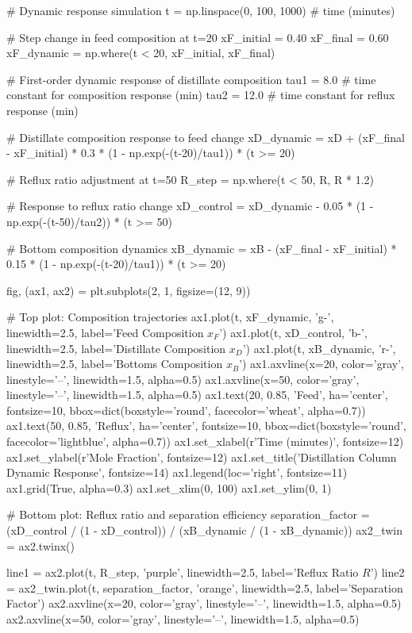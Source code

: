 \documentclass[11pt,a4paper]{article}
\begin{document}
\begin{pycode}
# Dynamic response simulation
t = np.linspace(0, 100, 1000)  # time (minutes)

# Step change in feed composition at t=20
xF_initial = 0.40
xF_final = 0.60
xF_dynamic = np.where(t < 20, xF_initial, xF_final)

# First-order dynamic response of distillate composition
tau1 = 8.0  # time constant for composition response (min)
tau2 = 12.0  # time constant for reflux response (min)

# Distillate composition response to feed change
xD_dynamic = xD + (xF_final - xF_initial) * 0.3 * (1 - np.exp(-(t-20)/tau1)) * (t >= 20)

# Reflux ratio adjustment at t=50
R_step = np.where(t < 50, R, R * 1.2)

# Response to reflux ratio change
xD_control = xD_dynamic - 0.05 * (1 - np.exp(-(t-50)/tau2)) * (t >= 50)

# Bottom composition dynamics
xB_dynamic = xB - (xF_final - xF_initial) * 0.15 * (1 - np.exp(-(t-20)/tau1)) * (t >= 20)

fig, (ax1, ax2) = plt.subplots(2, 1, figsize=(12, 9))

# Top plot: Composition trajectories
ax1.plot(t, xF_dynamic, 'g-', linewidth=2.5, label='Feed Composition $x_F$')
ax1.plot(t, xD_control, 'b-', linewidth=2.5, label='Distillate Composition $x_D$')
ax1.plot(t, xB_dynamic, 'r-', linewidth=2.5, label='Bottoms Composition $x_B$')
ax1.axvline(x=20, color='gray', linestyle='--', linewidth=1.5, alpha=0.5)
ax1.axvline(x=50, color='gray', linestyle='--', linewidth=1.5, alpha=0.5)
ax1.text(20, 0.85, 'Feed\nDisturbance', ha='center', fontsize=10,
         bbox=dict(boxstyle='round', facecolor='wheat', alpha=0.7))
ax1.text(50, 0.85, 'Reflux\nAdjustment', ha='center', fontsize=10,
         bbox=dict(boxstyle='round', facecolor='lightblue', alpha=0.7))
ax1.set_xlabel(r'Time (minutes)', fontsize=12)
ax1.set_ylabel(r'Mole Fraction', fontsize=12)
ax1.set_title('Distillation Column Dynamic Response', fontsize=14)
ax1.legend(loc='right', fontsize=11)
ax1.grid(True, alpha=0.3)
ax1.set_xlim(0, 100)
ax1.set_ylim(0, 1)

# Bottom plot: Reflux ratio and separation efficiency
separation_factor = (xD_control / (1 - xD_control)) / (xB_dynamic / (1 - xB_dynamic))
ax2_twin = ax2.twinx()

line1 = ax2.plot(t, R_step, 'purple', linewidth=2.5, label='Reflux Ratio $R$')
line2 = ax2_twin.plot(t, separation_factor, 'orange', linewidth=2.5, label='Separation Factor')
ax2.axvline(x=20, color='gray', linestyle='--', linewidth=1.5, alpha=0.5)
ax2.axvline(x=50, color='gray', linestyle='--', linewidth=1.5, alpha=0.5)


\end{pycode}
\end{document}
